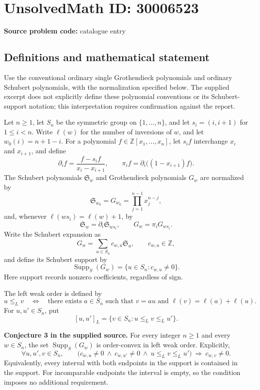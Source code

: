 \documentclass[11pt]{article}
\newcommand{\Z}{\mathbb{Z}}
\begin{document}
\section*{UnsolvedMath ID: 30006523}
\textbf{Source problem code:} catalogue entry
\subsection{Definitions and mathematical statement}
Use the conventional ordinary single Grothendieck polynomials and ordinary Schubert polynomials, with the normalization specified below. The supplied excerpt does not explicitly define these polynomial conventions or its Schubert-support notation; this interpretation requires confirmation against the report.

Let \(n\geq 1\), let \(S_n\) be the symmetric group on \(\{1,\ldots,n\}\), and let \(s_i=(i,i+1)\) for \(1\leq i<n\). Write \(\ell(w)\) for the number of inversions of \(w\), and let \(w_0(i)=n+1-i\). For a polynomial \(f\in\Z[x_1,\ldots,x_n]\), let \(s_i f\) interchange \(x_i\) and \(x_{i+1}\), and define
\[
\partial_i f=\frac{f-s_i f}{x_i-x_{i+1}},
\qquad
\pi_i f=\partial_i\bigl((1-x_{i+1})f\bigr).
\]
The Schubert polynomials \(\mathfrak S_w\) and Grothendieck polynomials \(G_w\) are normalized by
\[
\mathfrak S_{w_0}=G_{w_0}=\prod_{j=1}^{n-1}x_j^{n-j},
\]
and, whenever \(\ell(ws_i)=\ell(w)+1\), by
\[
\mathfrak S_w=\partial_i\mathfrak S_{ws_i},
\qquad
G_w=\pi_iG_{ws_i}.
\]
Write the Schubert expansion as
\[
G_w=\sum_{u\in S_n}c_{w,u}\mathfrak S_u,
\qquad c_{w,u}\in\Z,
\]
and define its Schubert support by
\[
\operatorname{Supp}_S(G_w)=\{u\in S_n:c_{w,u}\neq0\}.
\]
Here support records nonzero coefficients, regardless of sign.

The left weak order is defined by
\[
u\leq_L v
\quad\Longleftrightarrow\quad
\text{there exists }a\in S_n\text{ such that }v=au
\text{ and }\ell(v)=\ell(a)+\ell(u).
\]
For \(u,u'\in S_n\), put
\[
[u,u']_L=\{v\in S_n:u\leq_L v\leq_L u'\}.
\]

\textbf{Conjecture 3 in the supplied source.} For every integer \(n\geq1\) and every \(w\in S_n\), the set \(\operatorname{Supp}_S(G_w)\) is order-convex in left weak order. Explicitly,
\[
\forall u,u',v\in S_n,\qquad
\bigl(c_{w,u}\neq0\ \land\ c_{w,u'}\neq0\ \land\ u\leq_L v\leq_L u'\bigr)
\ \Longrightarrow\ c_{w,v}\neq0.
\]
Equivalently, every interval with both endpoints in the support is contained in the support. For incomparable endpoints the interval is empty, so the condition imposes no additional requirement.
\end{document}
